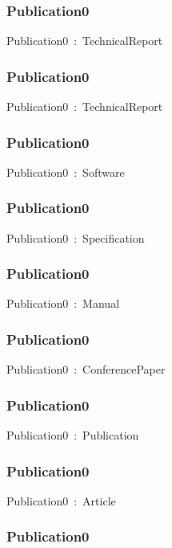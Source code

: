 \documentclass{article}
\begin{document}
\subsubsection*{Publication0}

Publication0~:~TechnicalReport

\subsubsection*{Publication0}

Publication0~:~TechnicalReport

\subsubsection*{Publication0}

Publication0~:~Software

\subsubsection*{Publication0}

Publication0~:~Specification

\subsubsection*{Publication0}

Publication0~:~Manual

\subsubsection*{Publication0}

Publication0~:~ConferencePaper

\subsubsection*{Publication0}

Publication0~:~Publication

\subsubsection*{Publication0}

Publication0~:~Article

\subsubsection*{Publication0}
\end{document}
